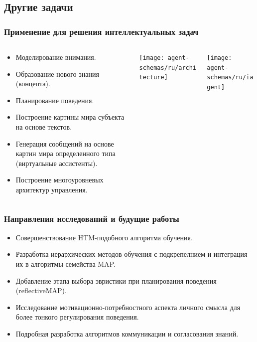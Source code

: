 \documentclass[default]{beamer}
\begin{document}
	\subsection{Другие задачи}
	\begin{frame}
		\frametitle{Применение для решения интеллектуальных задач}
		\vspace{-5pt}
		\footnotesize
		\begin{columns}
			\begin{column}{0.5\textwidth}
				\begin{itemize}
					\item Моделирование внимания.
					\item Образование нового знания (концепта).
					\item Планирование поведения.
					\item Построение картины мира субъекта на основе текстов.
					\item Генерация сообщений на основе картин мира определенного типа (виртуальные ассистенты).
					\item Построение многоуровневых архитектур управления.
				\end{itemize}
				
			\end{column}
			\begin{column}{0.35\textwidth}
				\texttt{[image: agent-schemas/ru/architecture]}
			\end{column}
			\begin{column}{0.15\textwidth}
				\texttt{[image: agent-schemas/ru/iagent]}
			\end{column}
			
		\end{columns}
		\vspace{-5pt}
		\nocite{*}
		\printbibliography[keyword={strl}, resetnumbers=true]
	\end{frame}

	\begin{frame}
		\frametitle{Направления исследований и будущие работы}
		
		\begin{itemize}
			\item Совершенствование HTM-подобного алгоритма обучения.
			\item Разработка иерархических методов обучения с подкрепелнием и интеграция их в алгоритмы семейства MAP.
			\item Добавление этапа выбора эвристики при планирования поведения (reflectiveMAP).
			\item Исследование мотивационно-потребностного аспекта личного смысла для более тонкого регулирования поведения.
			\item Подробная разработка алгоритмов коммуникации и согласования знаний.
		\end{itemize}
	\end{frame}
\end{document}
